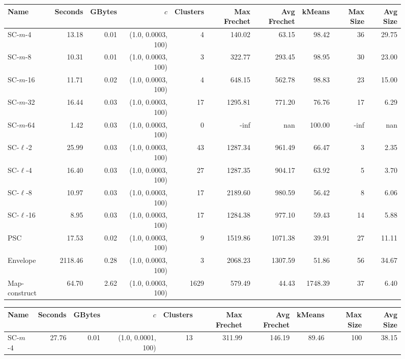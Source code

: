     \begin{figure} \begin{center}
    \begin{minipage}{\textwidth}
    {
    \begin{tabular}{@{}lrrrrrrrrr@{}}
        \toprule
        Name & Seconds & GBytes & $c$ & Clusters & Max Frechet & Avg Frechet & kMeans & Max Size & Avg Size\\
        \midrule
        SC-$m$-4 & 13.18 & 0.01 & (1.0, 0.0003, 100) & 4 & 140.02 & 63.15 & 98.42 & 36 & 29.75\\
SC-$m$-8 & 10.31 & 0.01 & (1.0, 0.0003, 100) & 3 & 322.77 & 293.45 & 98.95 & 30 & 23.00\\
SC-$m$-16 & 11.71 & 0.02 & (1.0, 0.0003, 100) & 4 & 648.15 & 562.78 & 98.83 & 23 & 15.00\\
SC-$m$-32 & 16.44 & 0.03 & (1.0, 0.0003, 100) & 17 & 1295.81 & 771.20 & 76.76 & 17 & 6.29\\
SC-$m$-64 & 1.42 & 0.03 & (1.0, 0.0003, 100) & 0 & -inf & nan & 100.00 & -inf & nan\\
SC-$\ell$-2 & 25.99 & 0.03 & (1.0, 0.0003, 100) & 43 & 1287.34 & 961.49 & 66.47 & 3 & 2.35\\
SC-$\ell$-4 & 16.40 & 0.03 & (1.0, 0.0003, 100) & 27 & 1287.35 & 904.17 & 63.92 & 5 & 3.70\\
SC-$\ell$-8 & 10.97 & 0.03 & (1.0, 0.0003, 100) & 17 & 2189.60 & 980.59 & 56.42 & 8 & 6.06\\
SC-$\ell$-16 & 8.95 & 0.03 & (1.0, 0.0003, 100) & 17 & 1284.38 & 977.10 & 59.43 & 14 & 5.88\\
PSC & 17.53 & 0.02 & (1.0, 0.0003, 100) & 9 & 1519.86 & 1071.38 & 39.91 & 27 & 11.11\\
Envelope & 2118.46 & 0.28 & (1.0, 0.0003, 100) & 3 & 2068.23 & 1307.59 & 51.86 & 56 & 34.67\\
Map-construct & 64.70 & 2.62 & (1.0, 0.0003, 100) & 1629 & 579.49 & 44.43 & 1748.39 & 37 & 6.40\\
        \bottomrule
    \end{tabular}
    }
    {
    \begin{tabular}{@{}lrrrrrrrrr@{}}
        \toprule
        Name & Seconds & GBytes & $c$ & Clusters & Max Frechet & Avg Frechet & kMeans & Max Size & Avg Size\\
        \midrule
        SC-$m$-4 & 27.76 & 0.01 & (1.0, 0.0001, 100) & 13 & 311.99 & 146.19 & 89.46 & 100 & 38.15\\

\end{tabular}}
\end{minipage}
\end{center}
\end{figure}
